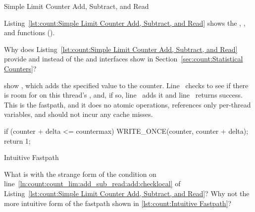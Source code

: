 \begin{listing}[tbp]

\caption{Simple Limit Counter Add, Subtract, and Read}
\label{lst:count:Simple Limit Counter Add, Subtract, and Read}
\end{listing}

Listing~\ref{lst:count:Simple Limit Counter Add, Subtract, and Read}
shows the , , and 
functions ().

\QuickQuiz{}
	Why does
	Listing~\ref{lst:count:Simple Limit Counter Add, Subtract, and Read}
	provide  and  instead of the
	 and  interfaces show in
	Section~\ref{sec:count:Statistical Counters}?
 \QuickQuizEnd

\begin{lineref}
 show ,
which adds the specified value 
to the counter.
Line~ checks to see if there is room for
 on this thread's
, and, if so,
line~ adds it and line~ returns success.
This is the  fastpath, and it does no atomic operations,
references only per-thread variables, and should not incur any cache misses.
\end{lineref}

\begin{listing}[tbp]
\begin{VerbatimL}[firstnumber=3]
	if (counter + delta <= countermax) {
		WRITE_ONCE(counter, counter + delta);
		return 1;
	}
\end{VerbatimL}
\caption{Intuitive Fastpath}
\label{lst:count:Intuitive Fastpath}
\end{listing}

\QuickQuiz{}
	What is with the strange form of the condition on
	line~\ref{ln:count:count_lim:add_sub_read:add:checklocal} of
	Listing~\ref{lst:count:Simple Limit Counter Add, Subtract, and Read}?
	Why not the more intuitive form of the fastpath shown in
	\cref{lst:count:Intuitive Fastpath}?
 \QuickQuizEnd


